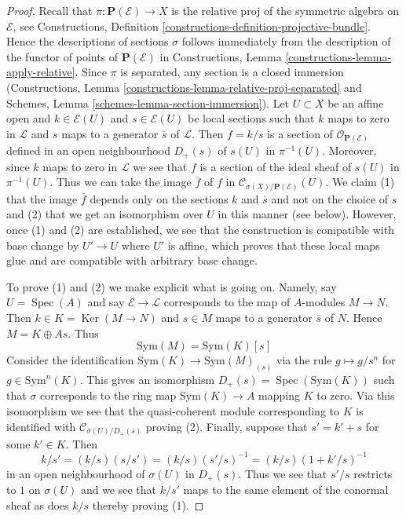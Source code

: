\documentclass[10pt,a4paper]{amsart}
\theoremstyle{plain}
\theoremstyle{definition}
\theoremstyle{remark}
\numberwithin{equation}{subsection}
\def\Spec{\mathop{\mathrm{Spec}}}
\def\Ker{\mathop{\mathrm{Ker}}}
\begin{document}
\begin{proof}
Recall that $\pi : \mathbf{P}(\mathcal{E}) \to X$ is the relative proj of the
symmetric algebra on $\mathcal{E}$, see
Constructions, Definition \ref{constructions-definition-projective-bundle}.
Hence the descriptions of sections $\sigma$ follows immediately from
the description of the functor of points of $\mathbf{P}(\mathcal{E})$
in Constructions, Lemma \ref{constructions-lemma-apply-relative}.
Since $\pi$ is separated, any section is a closed immersion
(Constructions, Lemma \ref{constructions-lemma-relative-proj-separated} and
Schemes, Lemma \ref{schemes-lemma-section-immersion}).
Let $U \subset X$ be an affine open and $k \in \mathcal{E}(U)$ and
$s \in \mathcal{E}(U)$ be local sections such that $k$ maps to
zero in $\mathcal{L}$ and $s$ maps to a generator $\overline{s}$
of $\mathcal{L}$.
Then $f = k/s$ is a section of $\mathcal{O}_{\mathbf{P}(\mathcal{E})}$
defined in an open neighbourhood $D_+(s)$ of $s(U)$ in $\pi^{-1}(U)$.
Moreover, since $k$ maps to zero in $\mathcal{L}$ we see that
$f$ is a section of the ideal sheaf of $s(U)$ in $\pi^{-1}(U)$.
Thus we can take the image $\overline{f}$ of $f$ in
$\mathcal{C}_{\sigma(X)/\mathbf{P}(\mathcal{E})}(U)$.
We claim (1) that the image $\overline{f}$ depends only on the
sections $k$ and $\overline{s}$ and not on the choice of $s$
and (2) that we get an isomorphism over $U$ in this manner (see below).
However, once (1) and (2) are established, we see that
the construction is compatible with base change by $U' \to U$
where $U'$ is affine, which proves that these local maps glue
and are compatible with arbitrary base change.

\medskip\noindent
To prove (1) and (2) we make explicit what is going on.
Namely, say $U = \Spec(A)$ and say $\mathcal{E} \to \mathcal{L}$
corresponds to the map of $A$-modules $M \to N$. Then
$k \in K = \Ker(M \to N)$ and $s \in M$ maps to a generator $\overline{s}$
of $N$. Hence $M = K \oplus A s$. Thus
$$
\text{Sym}(M) = \text{Sym}(K)[s]
$$
Consider the identification $\text{Sym}(K) \to \text{Sym}(M)_{(s)}$
via the rule $g \mapsto g/s^n$ for $g \in \text{Sym}^n(K)$.
This gives an isomorphism $D_+(s) = \Spec(\text{Sym}(K))$ such
that $\sigma$ corresponds to the ring map $\text{Sym}(K) \to A$
mapping $K$ to zero. Via this isomorphism we see that the quasi-coherent
module corresponding to $K$ is identified with
$\mathcal{C}_{\sigma(U)/D_+(s)}$ proving (2).
Finally, suppose that $s' = k' + s$ for some $k' \in K$.
Then
$$
k/s' = (k/s) (s/s') = (k/s) (s'/s)^{-1} = (k/s) (1 + k'/s)^{-1}
$$
in an open neighbourhood of $\sigma(U)$ in $D_+(s)$. Thus we see that
$s'/s$ restricts to $1$ on $\sigma(U)$ and we see that $k/s'$ maps to
the same element of the conormal sheaf as does $k/s$ thereby proving (1).
\end{proof}
\end{document}
